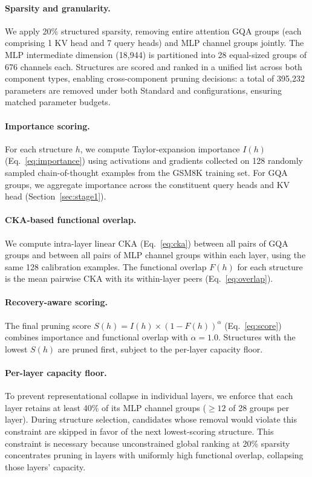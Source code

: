 \paragraph{Sparsity and granularity.}
We apply 20\% structured sparsity, removing entire attention GQA groups (each comprising 1 KV head and 7 query heads) and MLP channel groups jointly.
The MLP intermediate dimension (18{,}944) is partitioned into 28 equal-sized groups of 676 channels each.
Structures are scored and ranked in a unified list across both component types, enabling cross-component pruning decisions: a total of 395{,}232 parameters are removed under both Standard and \rasp{} configurations, ensuring matched parameter budgets.

\paragraph{Importance scoring.}
For each structure $h$, we compute Taylor-expansion importance $I(h)$ (Eq.~\ref{eq:importance}) using activations and gradients collected on 128 randomly sampled chain-of-thought examples from the GSM8K training set.
For GQA groups, we aggregate importance across the constituent query heads and KV head (Section~\ref{sec:stage1}).

\paragraph{CKA-based functional overlap.}
We compute intra-layer linear CKA (Eq.~\ref{eq:cka}) between all pairs of GQA groups and between all pairs of MLP channel groups within each layer, using the same 128 calibration examples.
The functional overlap $F(h)$ for each structure is the mean pairwise CKA with its within-layer peers (Eq.~\ref{eq:overlap}).

\paragraph{Recovery-aware scoring.}
The final pruning score $S(h) = I(h) \times (1 - F(h))^\alpha$ (Eq.~\ref{eq:score}) combines importance and functional overlap with $\alpha{=}1.0$.
Structures with the lowest $S(h)$ are pruned first, subject to the per-layer capacity floor.

\paragraph{Per-layer capacity floor.}
To prevent representational collapse in individual layers, we enforce that each layer retains at least 40\% of its MLP channel groups (${\ge}12$ of 28 groups per layer).
During structure selection, candidates whose removal would violate this constraint are skipped in favor of the next lowest-scoring structure.
This constraint is necessary because unconstrained global ranking at 20\% sparsity concentrates pruning in layers with uniformly high functional overlap, collapsing those layers' capacity.

